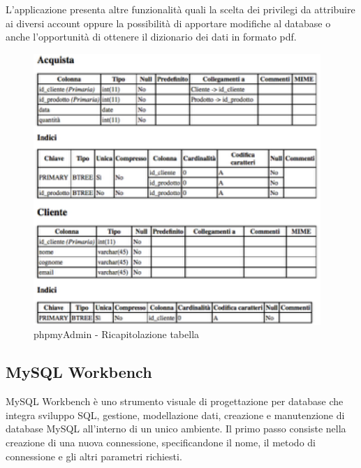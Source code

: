 L'applicazione presenta altre funzionalità quali la scelta dei privilegi da attribuire ai diversi account oppure la possibilità di apportare modifiche al database o anche l'opportunità  di ottenere il dizionario dei dati in formato pdf.

\begin{center}
\begin{figure}[H]
\centering
\includegraphics[scale=0.8]{figures/phpmyAdmin_tablerecap.png}
\caption{phpmyAdmin - Ricapitolazione tabella} 
\end{figure}
\end{center}


\subsection{MySQL Workbench}

MySQL Workbench è uno strumento visuale di progettazione per database che integra sviluppo SQL, gestione, modellazione dati, creazione e manutenzione di database MySQL all'interno di un unico ambiente. Il primo passo consiste nella creazione di una nuova connessione, specificandone il nome, il metodo di connessione e gli altri parametri richiesti.

